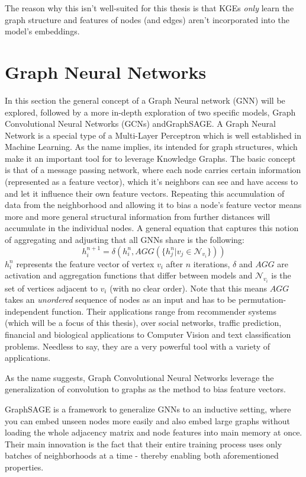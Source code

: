 \documentclass[draft,final]{vutinfth} %
\begin{document}
The reason why this isn't well-suited for this thesis is that KGEs \textit{only} learn the graph structure and features of nodes (and edges) aren't incorporated into the model's embeddings.


\section{Graph Neural Networks}
In this section the general concept of a Graph Neural network (GNN) will be explored, followed by a more in-depth exploration of two specific models, Graph Convolutional Neural Networks (GCNs) andGraphSAGE.
A Graph Neural Network is a special type of a Multi-Layer Perceptron which is well established in Machine Learning. As the name implies, its intended for graph structures, which make it an important tool for to leverage Knowledge Graphs. The basic concept is that of a message passing network, where each node carries certain information (represented as a feature vector), which it's neighbors can see and have access to and let it influence their own feature vectors. Repeating this accumulation of data from the neighborhood and allowing it to bias a node's feature vector means more and more general structural information from further distances will accumulate in the individual nodes. A general equation that captures this notion of aggregating and adjusting that all GNNs share is the following:
$$h^{n+1}_i = \delta(h^n_i,AGG(\{h^n_j | v_j \in \mathcal{N}_{v_i}\}))$$
$h^n_i$ represents the feature vector of vertex $v_i$ after $n$ iterations, $\delta$ and $AGG$ are activation and aggregation functions that differ between models and $\mathcal{N}_{v_i}$ is the set of vertices adjacent to $v_i$ (with no clear order). Note that this means $AGG$ takes an \textit{unordered} sequence of nodes as an input and has to be permutation-independent function. 
Their applications range from recommender systems (which will be a focus of this thesis), over social networks, traffic prediction, financial and biological applications to Computer Vision and text classification problems. Needless to say, they are a very powerful tool with a variety of applications. \cite{Explainable_GNNs}


As the name suggests, Graph Convolutional Neural Networks leverage the generalization of convolution to graphs as the method to bias feature vectors. 

GraphSAGE is a framework to generalize GNNs to an inductive setting, where you can embed unseen nodes more easily and also embed large graphs without loading the whole adjacency matrix and node features into main memory at once. Their main innovation is the fact that their entire training process uses only batches of neighborhoods at a time - thereby enabling both aforementioned properties. 
\end{document}

